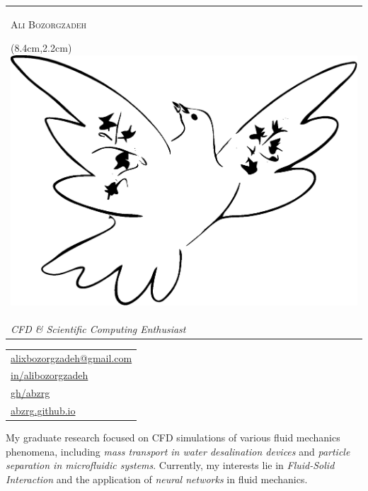 \documentclass[11pt, letterpaper]{article}
\newcommand{\name}{Ali Bozorgzadeh}
\newcommand{\whoAmIShort}{CFD \& Scientific Computing Enthusiast}
\begin{document}

\begin{minipage}[t][1.25in][t]{.5\textwidth}
\begin{tabular}{@{}l@{}} %
\\
{\Huge\scshape \name}
\begin{textblock*}{\textwidth}(8.4cm,2.2cm) %
\includegraphics[width=0.35\linewidth]{./figures/Dove.eps}
\end{textblock*}
\\[2.35ex]
{\large\itshape \color{jldGray} \whoAmIShort}
\end{tabular}
\end{minipage}
\hfill
\begin{minipage}[t][1.25in][t]{.3\textwidth}
\hfill
\begin{tabular}{l@{}}
    \href{mailto://alixbozorgzadeh@gmail.com}{\color{jldGray}alixbozorgzadeh\textcolor{jldGray!50}{@gmail.com}} \\
    \href{https://linkedin.com/in/alibozorgzadeh}{\color{jldGray}\textcolor{jldGray!50}{in/}alibozorgzadeh} \\
    \href{https://github.com/abzrg}{\color{jldGray}\textcolor{jldGray!50}{gh/}abzrg} \\
    \href{https://abzrg.github.io}{\color{jldGray}abzrg\textcolor{jldGray!50}{.github.io}}
\end{tabular}
\end{minipage}

\vspace{-2ex}
My graduate research focused on CFD simulations of various fluid mechanics
phenomena, including \emph{mass transport in water desalination devices} and
\emph{particle separation in microfluidic systems}. Currently, my interests lie
in \emph{Fluid-Solid Interaction} and the application of \emph{neural
networks} in fluid mechanics.

\end{document}
